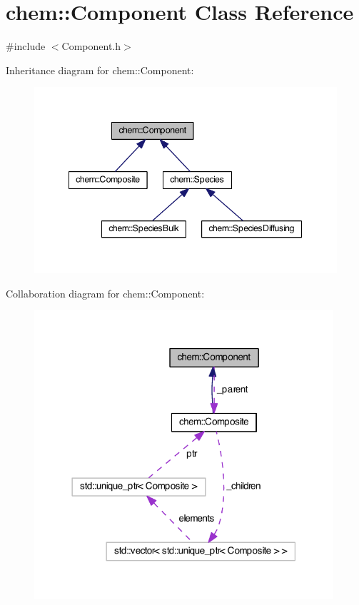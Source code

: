 \hypertarget{classchem_1_1Component}{\section{chem\-:\-:Component Class Reference}
\label{classchem_1_1Component}
}


{\ttfamily \#include $<$Component.\-h$>$}



Inheritance diagram for chem\-:\-:Component\-:
\nopagebreak
\begin{figure}[H]
\begin{center}
\leavevmode
\includegraphics[width=345pt]{classchem_1_1Component__inherit__graph}
\end{center}
\end{figure}


Collaboration diagram for chem\-:\-:Component\-:\nopagebreak
\begin{figure}[H]
\begin{center}
\leavevmode
\includegraphics[width=314pt]{classchem_1_1Component__coll__graph}
\end{center}
\end{figure}
